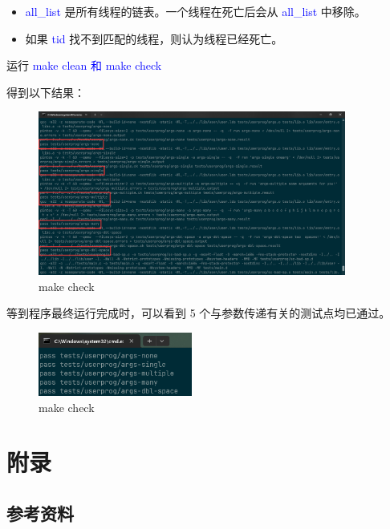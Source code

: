 \documentclass[14pt,a4paper,UTF8,twoside]{article}
\renewcommand{\texttt}[1]{\textcolor{blue}{\ttfamily #1}}
\begin{document}
\begin{itemize}
    \item \texttt{all\_list} 是所有线程的链表。一个线程在死亡后会从 \texttt{all\_list} 中移除。
    \item 如果 \texttt{tid} 找不到匹配的线程，则认为线程已经死亡。
\end{itemize}

运行 \texttt{make clean 和 make check}

得到以下结果：

\begin{figure}[H]
    \centering
    \includegraphics[width=0.9\textwidth]{img5/pass5.png}
    \caption{make check}
    \label{fig:check}
\end{figure}

等到程序最终运行完成时，可以看到 5 个与参数传递有关的测试点均已通过。

\begin{figure}[H]
    \centering
    \includegraphics[width=0.45\textwidth]{img5/pass.png}
    \caption{make check}
    \label{fig:check}
\end{figure}

\section{附录}

\subsection*{参考资料}
\end{document}
